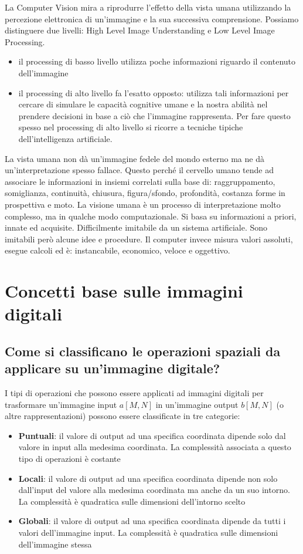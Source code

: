 La Computer Vision mira a riprodurre l'effetto della vista umana utilizzando la percezione elettronica di un'immagine e la sua successiva comprensione. Possiamo distinguere due livelli: High Level Image Understanding e Low Level Image Processing.
\begin{itemize}
	\item il processing di basso livello utilizza poche informazioni riguardo il contenuto dell'immagine
	\item il processing di alto livello fa l'esatto opposto: utilizza tali informazioni per cercare di simulare le capacità cognitive umane e la nostra abilità nel prendere decisioni in base a ciò che l'immagine rappresenta. Per fare questo spesso nel processing di alto livello si ricorre a tecniche tipiche dell'intelligenza artificiale.
\end{itemize}

La vista umana non dà un'immagine fedele del mondo esterno ma ne dà un'interpretazione spesso fallace. Questo perché il cervello umano tende ad associare le informazioni in insiemi correlati sulla base di: raggruppamento, somiglianza, continuità, chiusura, figura/sfondo, profondità, costanza forme in prospettiva e moto.
La visione umana è un processo di interpretazione molto complesso, ma in qualche modo computazionale. Si basa su informazioni a priori, innate ed acquisite. Difficilmente imitabile da un sistema artificiale. Sono imitabili però alcune idee e procedure. Il computer invece misura valori assoluti, esegue calcoli ed è: instancabile, economico, veloce e oggettivo.

\chapter{Concetti base sulle immagini digitali}

\section{Come si classificano le operazioni spaziali da applicare su un'immagine digitale?}
I tipi di operazioni che possono essere applicati ad immagini digitali per trasformare un'immagine input $a[M,N]$ in un'immagine output $b[M,N]$ (o altre rappresentazioni) possono essere classificate in tre categorie:
\begin{itemize}

\item \textbf{Puntuali}: il valore di output ad una specifica coordinata dipende solo dal valore in input alla medesima coordinata. La complessità associata a questo tipo di operazioni è costante

\item \textbf{Locali}: il valore di output ad una specifica coordinata dipende non solo dall'input del valore alla medesima coordinata ma anche da un suo intorno. La complessità è quadratica sulle dimensioni dell'intorno scelto

\item \textbf{Globali}: il valore di output ad una specifica coordinata dipende da tutti i valori dell'immagine input. La complessità è quadratica sulle dimensioni dell'immagine stessa
\end{itemize}

